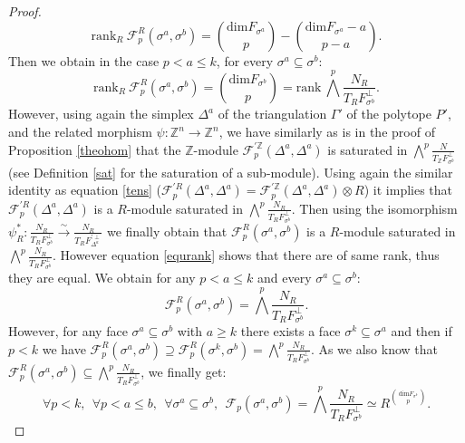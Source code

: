 \documentclass{article}
\begin{document}
\begin{proof}
\begin{equation*}
        \mathrm{rank}_R ~\mathcal{F}^R_p(\sigma^a,\sigma^b) = \binom{\mathrm{dim}F_{\sigma^a}}{p}-\binom{\mathrm{dim}F_{\sigma^a}-a}{p-a}.
    \end{equation*}
    Then we obtain in the case $p<a\leq k$, for every $\sigma^a \subseteq \sigma^b$:
    \begin{equation}
        \mathrm{rank}_R ~ \mathcal{F}_p^R(\sigma^a,\sigma^b) = \binom{\mathrm{dim}F_{\sigma^b}}{p} = \mathrm{rank}~ \bigwedge^p\frac{N_R}{T_RF_{\sigma^b}^{\perp}}.
        \label{equrank}
    \end{equation}
    However, using again the simplex $\Delta^a$ of the triangulation $\Gamma'$ of the polytope $P'$, and the related morphism $\psi: \mathbb{Z}^n \rightarrow \mathbb{Z}^n$, we have similarly as is in the proof of Proposition \ref{theohom} that the $\mathbb{Z}$-module $\mathcal{F}^{'\mathbb{Z}}_p(\Delta^a,\Delta^a)$ is saturated in $\bigwedge^p\frac{N}{T_{\mathbb{Z}}F_{\sigma^b}^{\perp}}$ (see Definition \ref{sat} for the saturation of a sub-module). Using again the similar identity as equation \ref{tens} ($\mathcal{F}_p^{'R}(\Delta^a,\Delta^a) = \mathcal{F}_p^{'\mathbb{Z}}(\Delta^a,\Delta^a) \otimes R$) it implies that $\mathcal{F}^{'R}_p(\Delta^a,\Delta^a)$ is a $R$-module saturated in $\bigwedge^p\frac{N_R}{T_RF_{\sigma^b}^{\perp}}$. Then using the isomorphism $\psi_R^*:\frac{N_R}{T_RF_{\sigma^b}^{\perp}}\overset{\sim}{\rightarrow}\frac{N_R}{T_RF^{'\perp}_{\Delta^a}}$ we finally obtain that $\mathcal{F}_p^R(\sigma^a,\sigma^b)$ is a $R$-module saturated in $\bigwedge^p\frac{N_R}{T_RF_{\sigma^b}^{\perp}}$. However equation \ref{equrank} shows that there are of same rank, thus they are equal. We obtain for any $p<a\leq k$ and every $\sigma^a \subseteq \sigma^b$:
    \begin{equation*}
        \mathcal{F}_p^R(\sigma^a,\sigma^b) = \bigwedge^p\frac{N_R}{T_RF_{\sigma^b}^{\perp}}.
    \end{equation*}
    However, for any face $\sigma^a\subseteq\sigma^b$ with $a\geq k$ there exists a face $\sigma^k \subseteq \sigma^a$ and then if $p<k$ we have $\mathcal{F}_p^R(\sigma^a,\sigma^b)\supseteq\mathcal{F}_p^R(\sigma^k,\sigma^b)=\bigwedge^p\frac{N_R}{T_RF_{\sigma^b}^{\perp}}$. As we also know that $\mathcal{F}_p^R(\sigma^a,\sigma^b)\subseteq\bigwedge^p\frac{N_R}{T_RF_{\sigma^b}^{\perp}}$, we finally get:
    \begin{equation*}
        \forall p<k, ~~\forall p < a\leq b, ~~\forall \sigma^a \subseteq \sigma^b,~~\mathcal{F}_p(\sigma^a,\sigma^b) = \bigwedge^p\frac{N_R}{T_RF_{\sigma^b}^{\perp}} \simeq R^{\binom{\mathrm{dim}F_{\sigma^b}}{p}}.
    \end{equation*}


\end{proof}
\end{document}
